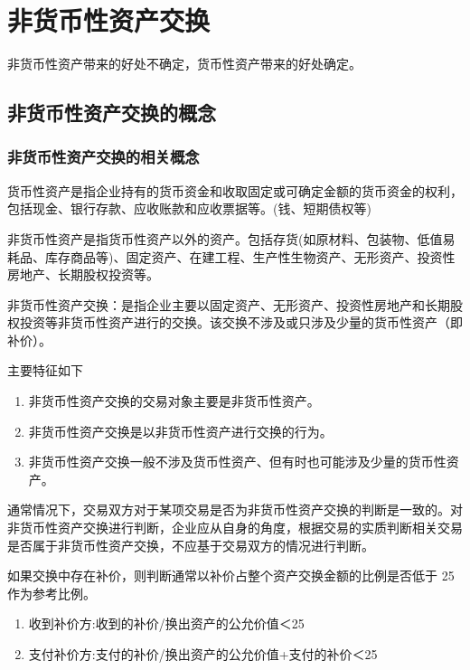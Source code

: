 \documentclass[UTF8,12pt]{ctexart}
\numberwithin{equation}{section} %
\numberwithin{figure}{section}
\numberwithin{table}{section}
\begin{document}
	\newpage
	\section{非货币性资产交换}
	非货币性资产带来的好处不确定，货币性资产带来的好处确定。
	\subsection{非货币性资产交换的概念}
	\subsubsection{非货币性资产交换的相关概念}
	货币性资产是指企业持有的货币资金和收取固定或可确定金额的货币资金的权利，包括现金、银行存款、应收账款和应收票据等。(钱、短期债权等)
	
	非货币性资产是指货币性资产以外的资产。包括存货(如原材料、包装物、低值易耗品、库存商品等)、固定资产、在建工程、生产性生物资产、无形资产、投资性房地产、长期股权投资等。
	
	非货币性资产交换：是指企业主要以固定资产、无形资产、投资性房地产和长期股权投资等非货币性资产进行的交换。该交换不涉及或只涉及少量的货币性资产（即补价）。
	
	主要特征如下
	\begin{enumerate}
		\item 非货币性资产交换的交易对象主要是非货币性资产。
		
		\item 非货币性资产交换是以非货币性资产进行交换的行为。
		
		\item 非货币性资产交换一般不涉及货币性资产、但有时也可能涉及少量的货币性资产。
		
	\end{enumerate}
	
	通常情况下，交易双方对于某项交易是否为非货币性资产交换的判断是一致的。对非货币性资产交换进行判断，企业应从自身的角度，根据交易的实质判断相关交易是否属于非货币性资产交换，不应基于交易双方的情况进行判断。
	
	如果交换中存在补价，则判断通常以补价占整个资产交换金额的比例是否低于 25作为参考比例。
	\begin{enumerate}
		\item 收到补价方:收到的补价/换出资产的公允价值＜25
		
		\item 支付补价方:支付的补价/换出资产的公允价值+支付的补价＜25
	\end{enumerate}
	
\end{document}
